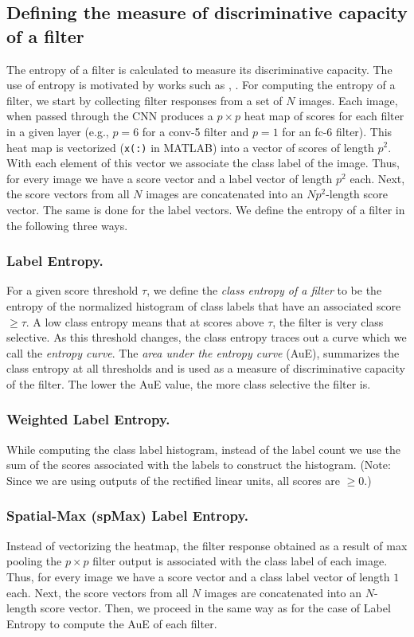 \subsection{Defining the measure of discriminative capacity of a filter}
\label{sub:fine-entropy}
The entropy of a filter is calculated to measure its discriminative capacity. The use of entropy is motivated by works such as \cite{Breiman}, \cite{AmitGeman}.
For computing the entropy of a filter, we start by collecting filter responses from a set of $N$ images.
Each image, when passed through the CNN produces a $p \times p$ heat map of scores for each filter in a given layer (e.g., $p = 6$ for a conv-5 filter and $p = 1$ for an fc-6 filter).
This heat map is vectorized (\texttt{x(:)} in MATLAB) into a vector of scores of length $p^2$. With each element of this vector we associate the class label of the image. 
Thus, for every image we have a score vector and a label vector of length $p^2$ each.
Next, the score vectors from all $N$ images are concatenated into an $Np^2$-length score vector.
The same is done for the label vectors. We define the entropy of a filter in the following three ways.

\subsubsection{Label Entropy.}
\label{sub:def-label-ent}
For a given score threshold $\tau$, we define the \emph{class entropy of a filter} to be the entropy of the normalized histogram of class labels that have an associated score $\geq \tau$.
A low class entropy means that at scores above $\tau$, the filter is very class selective.
As this threshold changes, the class entropy traces out a curve which we call the \emph{entropy curve}.
The \emph{area under the entropy curve} (AuE), summarizes the class entropy at all thresholds and is used as a measure of discriminative capacity of the filter. 
The lower the AuE value, the more class selective the filter is.

\subsubsection{Weighted Label Entropy.}
\label{sub:def-weighted-label-ent}
While computing the class label histogram, instead of the label count we use the sum of the scores associated with the labels to construct the histogram. (Note: Since we are using outputs of the rectified linear units, all scores are $\geq 0$.)

\subsubsection{Spatial-Max (spMax) Label Entropy.}
\label{sub:def-spmax-label-ent}
Instead of vectorizing the heatmap, the filter response obtained as a result of max pooling the $p \times p$ filter output is associated with the class label of each image. Thus, for every image we have a score vector and a class label vector of length $1$ each.
Next, the score vectors from all $N$ images are concatenated into an $N$-length score vector.
Then, we proceed in the same way as for the case of Label Entropy to compute the AuE of each filter. 

